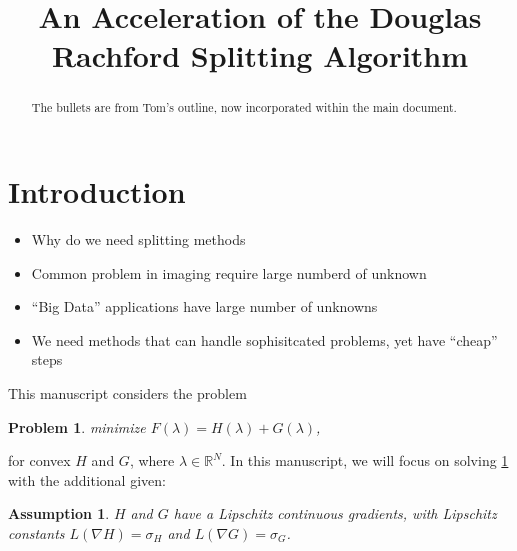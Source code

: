 \documentclass[11pt]{article}
\newcommand{\inner}[2]{\langle #1, #2\rangle}
\newcommand{\sub}{\partial}
\def\grad {{\nabla}}
\newtheorem{prb}{Problem}
\newtheorem{assum}{Assumption}
\begin{document}
\title{An Acceleration of the Douglas Rachford Splitting Algorithm}
\maketitle
\tableofcontents
\begin{abstract}
The bullets are from Tom's outline, now incorporated within the main document.
\end{abstract}
\section{Introduction}
\label{sec:intro}


\begin{itemize}
\item Why do we need splitting methods
\item Common problem in imaging require large numberd of unknown
\item ``Big Data'' applications have large number of unknowns
\item We need methods that can handle sophisitcated problems, yet have ``cheap'' steps
\end{itemize}






\noindent This manuscript considers the problem 

\begin{prb}
minimize $F(\lambda) = H(\lambda) + G(\lambda)$, \label{prb:1}
\end{prb}

\noindent for convex $H$ and $G$, where $\lambda \in \mathbb{R}^N$.
In this manuscript, we will focus on solving \cref{prb:1} with the
additional given:

\begin{assum}
\emph{$H$ and $G$ have a Lipschitz continuous gradients, with Lipschitz constants $L(\grad H) = \sigma_H$ and $L(\grad G) = \sigma_G$.} \label{assum:1}
\end{assum}
\end{document}
